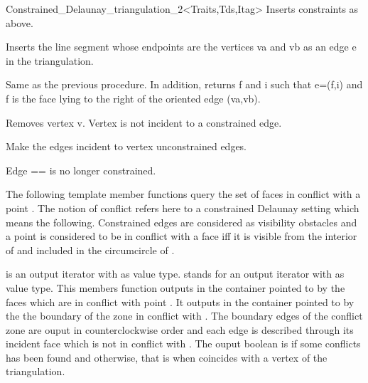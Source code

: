 \begin{ccRefClass}{Constrained_Delaunay_triangulation_2<Traits,Tds,Itag>}
{Inserts constraints  as above.}


{ Inserts the line segment whose endpoints are the vertices va and vb
as an edge e in the triangulation. }

{Same as the previous procedure. In addition, returns f and i such that
e=(f,i) and f is the face lying to the right of the oriented edge (va,vb). }


{ Removes vertex v. 
}\ccPrecond Vertex   is not incident to a constrained edge.

{Make the edges incident to vertex  unconstrained edges.}

{ Edge == is no longer constrained.}


The following template member functions query the
set of faces in conflict with a point .
The notion of conflict refers here to a 
constrained Delaunay setting which means the following.
Constrained edges are considered as visibility obstacles
and a point  is considered to be 
in conflict with a face  iff it is 
 visible from the interior of  and 
included in the circumcircle of .

{ 
 is an output iterator with  as value type.
 stands for an output iterator with  as value type.
This members function outputs in the container pointed to by 
the faces which are in conflict with point .
It outputs in the container pointed to by  the 
the boundary of the zone in conflict with .
The boundary edges
of the conflict  zone are ouput in counterclockwise order
and each edge is described  through its incident face
which is not in conflict with .
The ouput boolean is  if some conflicts has been found and 
otherwise, that is when  coincides with a vertex of the
triangulation.
}


\end{ccRefClass}
